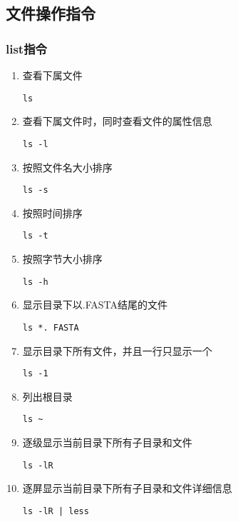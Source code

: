 \subsection{文件操作指令}
\subsubsection{list指令}

\begin{enumerate}
    \item 查看下属文件
          \begin{lstlisting}
ls
\end{lstlisting}

    \item 查看下属文件时，同时查看文件的属性信息
          \begin{lstlisting}
ls -l
\end{lstlisting}

    \item 按照文件名大小排序
          \begin{lstlisting}
ls -s
\end{lstlisting}

    \item 按照时间排序
          \begin{lstlisting}
ls -t 
\end{lstlisting}

    \item 按照字节大小排序
          \begin{lstlisting}
ls -h 
\end{lstlisting}

    \item 显示目录下以.FASTA结尾的文件
          \begin{lstlisting}
ls *. FASTA 
\end{lstlisting}

    \item 显示目录下所有文件，并且一行只显示一个
          \begin{lstlisting}
ls -1 
\end{lstlisting}

    \item 列出根目录
          \begin{lstlisting}
ls ~
\end{lstlisting}

    \item 逐级显示当前目录下所有子目录和文件
          \begin{lstlisting}
ls -lR
\end{lstlisting}

    \item 逐屏显示当前目录下所有子目录和文件详细信息
          \begin{lstlisting}
ls -lR | less 
\end{lstlisting}

\end{enumerate}

